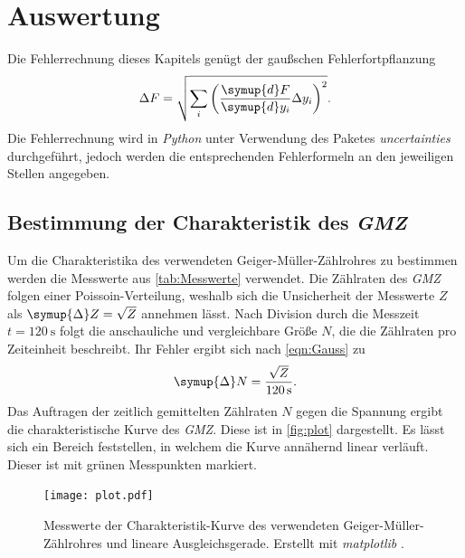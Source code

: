 \section{Auswertung}
\label{sec:Auswertung}
Die Fehlerrechnung dieses Kapitels genügt der gaußschen Fehlerfortpflanzung
\begin{equation}
  \label{eqn:Gauss}
  \Delta F = \sqrt{\sum_i\left(\frac{\symup{d}F}{\symup{d}y_i}\Delta y_i \right)^2}.
\end{equation}
Die Fehlerrechnung wird in \textit{Python} unter Verwendung des Paketes \textit{uncertainties} \cite{uncertainties} durchgeführt, jedoch werden die entsprechenden Fehlerformeln
an den jeweiligen Stellen angegeben.

\subsection{Bestimmung der Charakteristik des \textit{GMZ}}
\label{subsec:A_Charakteristik}
Um die Charakteristika des verwendeten Geiger-Müller-Zählrohres zu bestimmen werden die Messwerte aus \autoref{tab:Messwerte} verwendet.
Die Zählraten des \textit{GMZ} folgen einer Poissoin-Verteilung, weshalb sich die Unsicherheit der Messwerte $Z$ als $\symup{\Delta}Z = \sqrt{Z}$ annehmen lässt.
Nach Division durch die Messzeit $t = \qty{120}{\second}$ folgt die anschauliche und vergleichbare Größe $N$, die die Zählraten pro Zeiteinheit beschreibt.
Ihr Fehler ergibt sich nach \eqref{eqn:Gauss} zu 
\begin{equation*}
  \symup{\Delta}N = \frac{\sqrt{Z}}{\qty{120}{\second}}.
\end{equation*} 
Das Auftragen der zeitlich gemittelten Zählraten $N$ gegen die Spannung ergibt die charakteristische Kurve des \textit{GMZ}. Diese ist in \autoref{fig:plot}
dargestellt. Es lässt sich ein Bereich feststellen, in welchem die Kurve annähernd linear verläuft. Dieser ist mit grünen Messpunkten markiert. 

\begin{figure}
  \centering
  \texttt{[image: plot.pdf]}
  \caption{Messwerte der Charakteristik-Kurve des verwendeten Geiger-Müller-Zählrohres und lineare Ausgleichsgerade. Erstellt mit \textit{matplotlib} \cite{matplotlib}.}
  \label{fig:plot}
\end{figure}

